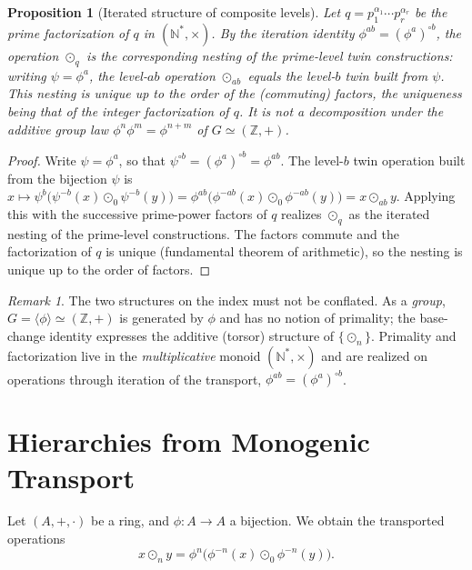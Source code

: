 \documentclass[11pt]{article}
\newtheorem{proposition}[theorem]{Proposition}
\theoremstyle{definition}
\theoremstyle{remark}
\newtheorem{remark}[theorem]{Remark}
\newcommand{\Z}{\mathbb{Z}}
\newcommand{\N}{\mathbb{N}}
\begin{document}
	\begin{proposition}[Iterated structure of composite levels]
		Let $q=p_1^{\alpha_1}\cdots p_r^{\alpha_r}$ be the prime factorization of $q$ in
		$(\N^*,\times)$. By the iteration identity $\phi^{ab}=(\phi^a)^{\circ b}$, the operation
		$\odot_q$ is the corresponding nesting of the prime-level twin constructions: writing
		$\psi=\phi^{a}$, the level-$ab$ operation $\odot_{ab}$ equals the level-$b$ twin built from
		$\psi$. This nesting is unique up to the order of the (commuting) factors, the uniqueness
		being that of the integer factorization of $q$. It is \emph{not} a decomposition under the
		additive group law $\phi^n\phi^m=\phi^{n+m}$ of $G\simeq(\Z,+)$.
	\end{proposition}
	\begin{proof}
		Write $\psi=\phi^{a}$, so that $\psi^{\circ b}=(\phi^{a})^{\circ b}=\phi^{ab}$. The level-$b$ twin
		operation built from the bijection $\psi$ is
		$x\mapsto\psi^{b}\!\bigl(\psi^{-b}(x)\odot_0\psi^{-b}(y)\bigr)
		=\phi^{ab}\!\bigl(\phi^{-ab}(x)\odot_0\phi^{-ab}(y)\bigr)=x\odot_{ab}y$. Applying this with the
		successive prime-power factors of $q$ realizes $\odot_q$ as the iterated nesting of the
		prime-level constructions. The factors commute and the factorization of $q$ is unique
		(fundamental theorem of arithmetic), so the nesting is unique up to the order of factors.
	\end{proof}

	\begin{remark}
		The two structures on the index must not be conflated. As a \emph{group},
		$G=\langle\phi\rangle\simeq(\Z,+)$ is generated by $\phi$ and has no notion of primality;
		the base-change identity expresses the additive (torsor) structure of $\{\odot_n\}$.
		Primality and factorization live in the \emph{multiplicative} monoid $(\N^*,\times)$ and are
		realized on operations through iteration of the transport, $\phi^{ab}=(\phi^a)^{\circ b}$.
	\end{remark}
	
	\section{Hierarchies from Monogenic Transport}
	\label{sec:3}
	
	Let $(A,+,\cdot)$ be a ring, and $\phi:A\to A$ a bijection.
	We obtain the transported operations
	\[
	x\odot_n y = \phi^{n}\bigl(\phi^{-n}(x)\odot_0\phi^{-n}(y)\bigr).
	\]
	
\end{document}
